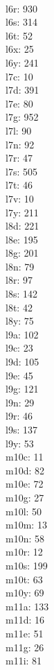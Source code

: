 \begin{multicols}{8}
  \\ l6r: 930
  \\ l6s: 314
  \\ l6t: 52
  \\ l6x: 25
  \\ l6y: 241
  \\ l7c: 10
  \\ l7d: 391
  \\ l7e: 80
  \\ l7g: 952
  \\ l7l: 90
  \\ l7n: 92
  \\ l7r: 47
  \\ l7s: 505
  \\ l7t: 46
  \\ l7v: 10
  \\ l7y: 211
  \\ l8d: 221
  \\ l8e: 195
  \\ l8g: 201
  \\ l8n: 79
  \\ l8r: 97
  \\ l8s: 142
  \\ l8t: 42
  \\ l8y: 75
  \\ l9a: 102
  \\ l9c: 23
  \\ l9d: 105
  \\ l9e: 45
  \\ l9g: 121
  \\ l9n: 29
  \\ l9r: 46
  \\ l9s: 137
  \\ l9y: 53
  \\ m10c: 11
  \\ m10d: 82
  \\ m10e: 72
  \\ m10g: 27
  \\ m10l: 50
  \\ m10m: 13
  \\ m10n: 58
  \\ m10r: 12
  \\ m10s: 199
  \\ m10t: 63
  \\ m10y: 69
  \\ m11a: 133
  \\ m11d: 16
  \\ m11e: 51
  \\ m11g: 26
  \\ m11i: 81

\end{multicols}
